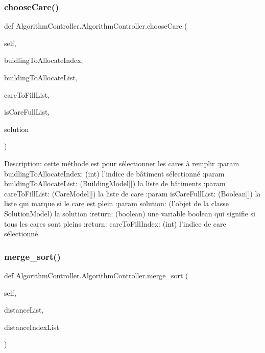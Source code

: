 \subsubsection{\texorpdfstring{choose\+Care()}{chooseCare()}}
{\footnotesize\ttfamily def Algorithm\+Controller.\+Algorithm\+Controller.\+choose\+Care (\begin{DoxyParamCaption}\item[{}]{self,  }\item[{}]{buidling\+To\+Allocate\+Index,  }\item[{}]{building\+To\+Allocate\+List,  }\item[{}]{care\+To\+Fill\+List,  }\item[{}]{is\+Care\+Full\+List,  }\item[{}]{solution }\end{DoxyParamCaption})}

\begin{DoxyVerb}Description: cette méthode est pour sélectionner les cares à remplir
:param buidlingToAllocateIndex: (int) l'indice de bâtiment sélectionné
:param buildingToAllocateList: (BuildingModel[]) la liste de bâtiments
:param careToFillList: (CareModel[]) la liste de care
:param isCareFullList: (Boolean[]) la liste qui marque si le care est plein
:param solution: (l'objet de la classe SolutionModel) la solution
:return: (boolean) une variable boolean qui signifie si tous les cares sont pleins
:return: careToFillIndex: (int) l'indice de care sélectionné
\end{DoxyVerb}
 \mbox{\label{class_algorithm_controller_1_1_algorithm_controller_a93353daa1fde6df34d6b22af6a773610}} 
\subsubsection{\texorpdfstring{merge\+\_\+sort()}{merge\_sort()}}
{\footnotesize\ttfamily def Algorithm\+Controller.\+Algorithm\+Controller.\+merge\+\_\+sort (\begin{DoxyParamCaption}\item[{}]{self,  }\item[{}]{distance\+List,  }\item[{}]{distance\+Index\+List }\end{DoxyParamCaption})}

